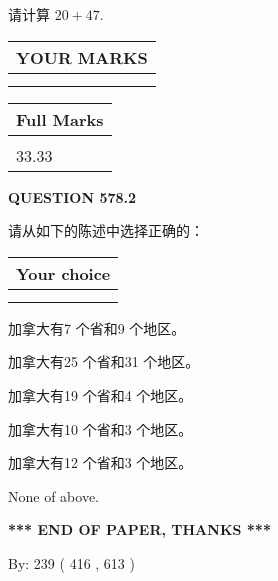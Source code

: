 \documentclass{ctexart}
\begin{document}
  
 
请计算 $ %
20 +  %
47 $.
 

 

 
  
\vspace{0.2in}
  
\noindent\begin{tabular}{|l|}
\hline
 YOUR MARKS  \\
\hline
 \\ 
 \\ 
\hline
\end{tabular}
\hspace{0.05in} \begin{tabular}{|l|}
\hline
 Full Marks  \\
\hline
 \\ 
33.33 \\
\hline
\end{tabular}
{\textbf{\Large{QUESTION
578.2 
}}}
  
  
请从如下的陈述中选择正确的：
  
  
\noindent\hspace{3.0in} \begin{tabular}{|l|}
\hline
Your choice \\
\hline
 \\ 
 \\ 
\hline
\end{tabular}
  
  
 
 
加拿大有7 个省和9 个地区。
 
 
加拿大有25 个省和31 个地区。
 
 
加拿大有19 个省和4 个地区。
 
 
加拿大有10 个省和3 个地区。
 
 
加拿大有12 个省和3 个地区。
 
 
 None of above.
 
 
   
   
 \vspace{0.2in}
 
   
   
   
   
\vspace{1.0in} 
{\textbf{\large{ *** END OF PAPER, THANKS *** }}} 
   
   
\hspace{1.0in} By: 
 239 ( 416 ,  613 )
   
\end{document}
